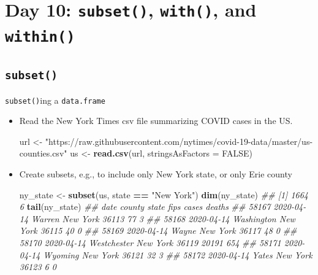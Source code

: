 \documentclass[]{book}
\newenvironment{Shaded}{\begin{snugshade}}{\end{snugshade}}
\newcommand{\CommentTok}[1]{\textcolor[rgb]{0.56,0.35,0.01}{\textit{#1}}}
\newcommand{\DataTypeTok}[1]{\textcolor[rgb]{0.13,0.29,0.53}{#1}}
\newcommand{\KeywordTok}[1]{\textcolor[rgb]{0.13,0.29,0.53}{\textbf{#1}}}
\newcommand{\NormalTok}[1]{#1}
\newcommand{\OperatorTok}[1]{\textcolor[rgb]{0.81,0.36,0.00}{\textbf{#1}}}
\newcommand{\OtherTok}[1]{\textcolor[rgb]{0.56,0.35,0.01}{#1}}
\newcommand{\StringTok}[1]{\textcolor[rgb]{0.31,0.60,0.02}{#1}}
\begin{document}
\hypertarget{day-10-subset-with-and-within}{%
\section{\texorpdfstring{Day 10: \texttt{subset()}, \texttt{with()}, and \texttt{within()}}{Day 10: subset(), with(), and within()}}\label{day-10-subset-with-and-within}}

\hypertarget{subset}{%
\subsection*{\texorpdfstring{\texttt{subset()}}{subset()}}\label{subset}}

\texttt{subset()}ing a \texttt{data.frame}

\begin{itemize}
\item
  Read the New York Times csv file summarizing COVID cases in the US.

\begin{Shaded}
\begin{Highlighting}[]
\NormalTok{url <-}
\StringTok{  "https://raw.githubusercontent.com/nytimes/covid-19-data/master/us-counties.csv"}
\NormalTok{us <-}\StringTok{ }\KeywordTok{read.csv}\NormalTok{(url, }\DataTypeTok{stringsAsFactors =} \OtherTok{FALSE}\NormalTok{)}
\end{Highlighting}
\end{Shaded}
\item
  Create subsets, e.g., to include only New York state, or only Erie county

\begin{Shaded}
\begin{Highlighting}[]
\NormalTok{ny_state <-}\StringTok{ }\KeywordTok{subset}\NormalTok{(us, state }\OperatorTok{==}\StringTok{ "New York"}\NormalTok{)}
\KeywordTok{dim}\NormalTok{(ny_state)}
\CommentTok{## [1] 1664    6}
\KeywordTok{tail}\NormalTok{(ny_state)}
\CommentTok{##             date      county    state  fips cases deaths}
\CommentTok{## 58167 2020-04-14      Warren New York 36113    77      3}
\CommentTok{## 58168 2020-04-14  Washington New York 36115    40      0}
\CommentTok{## 58169 2020-04-14       Wayne New York 36117    48      0}
\CommentTok{## 58170 2020-04-14 Westchester New York 36119 20191    654}
\CommentTok{## 58171 2020-04-14     Wyoming New York 36121    32      3}
\CommentTok{## 58172 2020-04-14       Yates New York 36123     6      0}


\end{Highlighting}
\end{Shaded}
\end{itemize}
\end{document}
